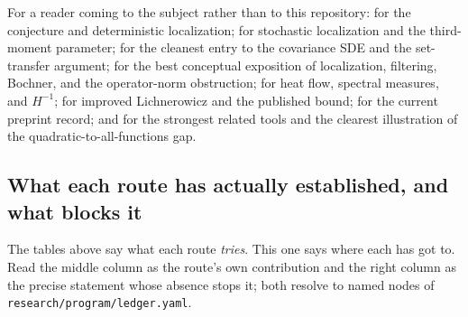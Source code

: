 \documentclass[../../main.tex]{subfiles}
\begin{document}
For a reader coming to the subject rather than to this repository:
\cite{KannanLovaszSimonovits1995} for the conjecture and deterministic localization;
\cite{Eldan2013ThinShell} for stochastic localization and the third-moment parameter;
\cite{LeeVempala2018,LeeVempala2024} for the cleanest entry to the covariance SDE and the
set-transfer argument; \cite{KLnotes} for the best conceptual exposition of localization,
filtering, Bochner, and the operator-norm obstruction; \cite{KlartagLehec2022Polylog} for heat
flow, spectral measures, and $H^{-1}$; \cite{Klartag2023Logarithmic} for improved Lichnerowicz and
the published bound; \cite{Letwin2026QuadraticKLS} for the current preprint record; and
\cite{KlartagLehec2025ThinShell,ChenKlartag2026SharpThinShell} for the strongest related tools and
the clearest illustration of the quadratic-to-all-functions gap.

\subsection{What each route has actually established, and what blocks it}
\label{subsec:atlas-state}

The tables above say what each route \emph{tries}. This one says where each has got to. Read the
middle column as the route's own contribution and the right column as the precise statement whose
absence stops it; both resolve to named nodes of \texttt{research/program/ledger.yaml}.
\end{document}
